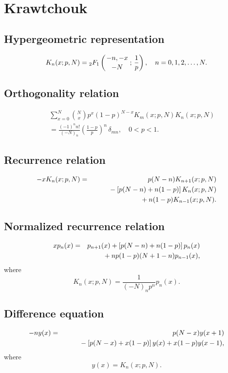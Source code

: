 \documentclass[envcountchap,graybox]{svmono}
\newcommand{\hyp}[5]{\mbox{}_{#1}{F}_{#2}
\left(\genfrac{}{}{0pt}{}{#3}{#4}\,;\,#5\right)}
\newcommand{\mathindent}{\hspace{7.5mm}}
\newcommand{\hyp}[5]{\,\mbox{}_{#1}F_{#2}\!\left(
  \genfrac{}{}{0pt}{}{#3}{#4};#5\right)}
\begin{document}
\section{Krawtchouk}

\par\setcounter{equation}{0}

\subsection*{Hypergeometric representation}
\begin{equation}
\label{DefKrawtchouk}
K_n(x;p,N)=\hyp{2}{1}{-n,-x}{-N}{\frac{1}{p}},\quad n=0,1,2,\ldots,N.
\end{equation}

\subsection*{Orthogonality relation}
\begin{eqnarray}
\label{OrtKrawtchouk}
& &\sum_{x=0}^N\binom{N}{x}p^x(1-p)^{N-x} K_m(x;p,N)K_n(x;p,N)\nonumber\\
& &{}=\frac{(-1)^nn!}{(-N)_n}\left(\frac{1-p}{p}\right)^n\,\delta_{mn},\quad0 < p < 1.
\end{eqnarray}

\subsection*{Recurrence relation}
\begin{eqnarray}
\label{RecKrawtchouk}
-xK_n(x;p,N)&=&p(N-n)K_{n+1}(x;p,N)\nonumber\\
& &{}\mathindent{}-\left[p(N-n)+n(1-p)\right]K_n(x;p,N)\nonumber\\
& &{}\mathindent\mathindent{}+n(1-p)K_{n-1}(x;p,N).
\end{eqnarray}

\subsection*{Normalized recurrence relation}
\begin{eqnarray}
\label{NormRecKrawtchouk}
xp_n(x)&=&p_{n+1}(x)+\left[p(N-n)+n(1-p)\right]p_n(x)\nonumber\\
& &{}\mathindent{}+np(1-p)(N+1-n)p_{n-1}(x),
\end{eqnarray}
where
$$K_n(x;p,N)=\frac{1}{(-N)_np^n}p_n(x).$$

\subsection*{Difference equation}
\begin{eqnarray}
\label{dvKrawtchouk}
-ny(x)&=&p(N-x)y(x+1)\nonumber\\
& &{}\mathindent{}-\left[p(N-x)+x(1-p)\right]y(x)+x(1-p)y(x-1),
\end{eqnarray}
where
$$y(x)=K_n(x;p,N).$$
\end{document}
